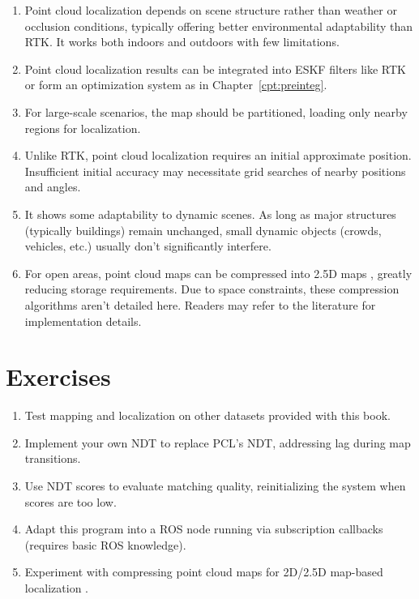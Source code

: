 \begin{enumerate}
	\item Point cloud localization depends on scene structure rather than weather or occlusion conditions, typically offering better environmental adaptability than RTK. It works both indoors and outdoors with few limitations.
	\item Point cloud localization results can be integrated into ESKF filters like RTK or form an optimization system as in Chapter~\ref{cpt:preinteg}.
	\item For large-scale scenarios, the map should be partitioned, loading only nearby regions for localization.
	\item Unlike RTK, point cloud localization requires an initial approximate position. Insufficient initial accuracy may necessitate grid searches of nearby positions and angles.
	\item It shows some adaptability to dynamic scenes. As long as major structures (typically buildings) remain unchanged, small dynamic objects (crowds, vehicles, etc.) usually don't significantly interfere.
	\item For open areas, point cloud maps can be compressed into 2.5D maps \cite{Wolcott2017,Wolcott2015,Wan2018}, greatly reducing storage requirements. Due to space constraints, these compression algorithms aren't detailed here. Readers may refer to the literature for implementation details.
\end{enumerate}

\section*{Exercises}
\begin{enumerate}
	\item Test mapping and localization on other datasets provided with this book.
	\item Implement your own NDT to replace PCL's NDT, addressing lag during map transitions.
	\item Use NDT scores to evaluate matching quality, reinitializing the system when scores are too low.
	\item Adapt this program into a ROS node running via subscription callbacks (requires basic ROS knowledge).
	\item Experiment with compressing point cloud maps for 2D/2.5D map-based localization \cite{Wolcott2017}.
\end{enumerate}



